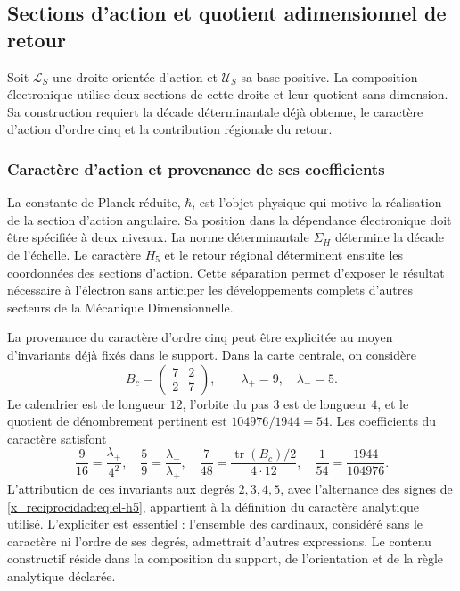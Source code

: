 \subsection{Sections d'action et quotient adimensionnel de retour}

Soit \(\mathcal L_S\) une droite orientée d'action et \(\mathcal U_S\)
sa base positive. La composition électronique utilise deux sections de
cette droite et leur quotient sans dimension. Sa construction requiert la
décade déterminantale déjà obtenue, le caractère d'action d'ordre cinq
et la contribution régionale du retour.

\subsubsection{Caractère d'action et provenance de ses coefficients}
\label{x_reciprocidad:sec:revision-planck}

La constante de Planck réduite, \(\hbar\), est l'objet physique qui
motive la réalisation de la section d'action angulaire. Sa position dans
la dépendance électronique doit être spécifiée à deux niveaux. La norme
déterminantale \(\Sigma_H\) détermine la décade de l'échelle. Le caractère
\(H_5\) et le retour régional déterminent ensuite les coordonnées des
sections d'action. Cette séparation permet d'exposer le résultat
nécessaire à l'électron sans anticiper les développements complets
d'autres secteurs de la Mécanique Dimensionnelle.

La provenance du caractère d'ordre cinq peut être explicitée au moyen
d'invariants déjà fixés dans le support. Dans la carte centrale, on considère
\[
 B_c=\begin{pmatrix}7&2\\2&7\end{pmatrix},
 \qquad \lambda_+=9,\quad\lambda_-=5.
\]
Le calendrier est de longueur \(12\), l'orbite du pas \(3\) est de
longueur \(4\), et le quotient de dénombrement pertinent est
\(104976/1944=54\). Les coefficients du caractère satisfont
\begin{equation}
 \frac9{16}=\frac{\lambda_+}{4^2},\quad
 \frac59=\frac{\lambda_-}{\lambda_+},\quad
 \frac7{48}=\frac{\operatorname{tr}(B_c)/2}{4\cdot12},\quad
 \frac1{54}=\frac{1944}{104976}.
 \label{x_reciprocidad:eq:revision-h5-coeficientes}
\end{equation}
L'attribution de ces invariants aux degrés \(2,3,4,5\), avec
l'alternance des signes de \eqref{x_reciprocidad:eq:el-h5}, appartient à la définition du
caractère analytique utilisé. L'expliciter est essentiel : l'ensemble des
cardinaux, considéré sans le caractère ni l'ordre de ses degrés,
admettrait d'autres expressions. Le contenu constructif réside dans la
composition du support, de l'orientation et de la règle analytique déclarée.

